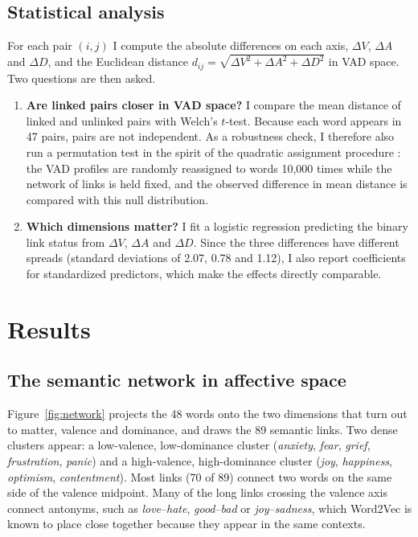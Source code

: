\documentclass[11pt,a4paper]{article}
\newcommand{\dV}{\Delta V}
\newcommand{\dA}{\Delta A}
\newcommand{\dD}{\Delta D}
\begin{document}
\subsection{Statistical analysis}

For each pair $(i,j)$ I compute the absolute differences on each axis,
$\dV$, $\dA$ and $\dD$, and the Euclidean distance
$d_{ij} = \sqrt{\dV^2 + \dA^2 + \dD^2}$ in VAD space. Two questions are
then asked.

\begin{enumerate}
  \item \textbf{Are linked pairs closer in VAD space?} I compare the mean
  distance of linked and unlinked pairs with Welch's $t$-test. Because each
  word appears in 47 pairs, pairs are not independent. As a robustness
  check, I therefore also run a permutation test in the spirit of the
  quadratic assignment procedure \citep{krackhardt1988}: the VAD profiles
  are randomly reassigned to words 10{,}000 times while the network of links
  is held fixed, and the observed difference in mean distance is compared
  with this null distribution.
  \item \textbf{Which dimensions matter?} I fit a logistic regression
  predicting the binary link status from $\dV$, $\dA$ and $\dD$. Since the
  three differences have different spreads (standard deviations of 2.07,
  0.78 and 1.12), I also report coefficients for standardized predictors,
  which make the effects directly comparable.
\end{enumerate}

\section{Results}

\subsection{The semantic network in affective space}

Figure~\ref{fig:network} projects the 48 words onto the two dimensions that
turn out to matter, valence and dominance, and draws the 89 semantic links.
Two dense clusters appear: a low-valence, low-dominance cluster
(\emph{anxiety}, \emph{fear}, \emph{grief}, \emph{frustration},
\emph{panic}) and a high-valence, high-dominance cluster (\emph{joy},
\emph{happiness}, \emph{optimism}, \emph{contentment}). Most links (70 of
89) connect two words on the same side of the valence midpoint. Many of the
long links crossing the valence axis connect antonyms, such as
\emph{love}--\emph{hate}, \emph{good}--\emph{bad} or
\emph{joy}--\emph{sadness}, which Word2Vec is known to place close
together because they appear in the same contexts.
\end{document}
